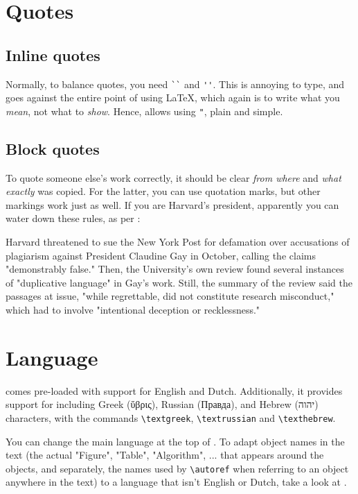 \section{Quotes}
\subsection{Inline quotes}
Normally, to balance quotes, you need \verb|``| and \verb|''|. This is annoying to type, and goes against the entire point of using \LaTeX{}, which again is to write what you \emph{mean}, not what to \emph{show}. Hence, \repo allows using \verb|"|, plain and simple.

\subsection{Block quotes}
To quote someone else's work correctly, it should be clear \emph{from where} and \emph{what exactly} was copied. For the latter, you can use quotation marks, but other markings work just as well. If you are Harvard's president, apparently you can water down these rules, as per \textcite{kettles_law_2023}:
\begin{blockquote}
	Harvard threatened to sue the New York Post for defamation over accusations of plagiarism against President Claudine Gay in October, calling the claims "demonstrably false." Then, the University’s own review found several instances of "duplicative language" in Gay’s work. \ellipsis Still, the summary of the review said the passages at issue, "while regrettable, did not constitute research misconduct," which had to involve "intentional deception or recklessness."
\end{blockquote}


\section{Language}
\repo comes pre-loaded with support for English and Dutch. Additionally, it provides support for including Greek (\textgreek{ὕβρις}), Russian (\textrussian{Правда}), and Hebrew (\texthebrew{יהוה}) characters, with the commands \verb|\textgreek|, \verb|\textrussian| and \verb|\texthebrew|.

You can change the main language at the top of . To adapt object names in the text (the actual "Figure", "Table", "Algorithm", ... that appears around the objects, and separately, the names used by \verb|\autoref| when referring to an object anywhere in the text) to a language that isn't English or Dutch, take a look at .

